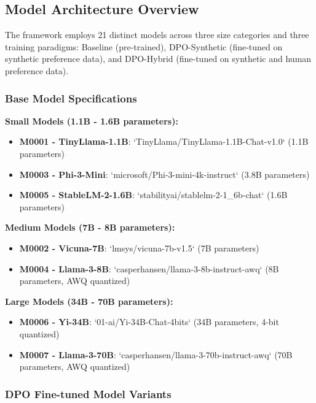 \subsection{Model Architecture Overview}
\label{subsec:model-architecture}

The framework employs 21 distinct models across three size categories and three training paradigms: Baseline (pre-trained), DPO-Synthetic (fine-tuned on synthetic preference data), and DPO-Hybrid (fine-tuned on synthetic and human preference data).

\subsubsection{Base Model Specifications}

\textbf{Small Models (1.1B - 1.6B parameters):}
\begin{itemize}
    \item \textbf{M0001 - TinyLlama-1.1B}: `TinyLlama/TinyLlama-1.1B-Chat-v1.0` (1.1B parameters)
    \item \textbf{M0003 - Phi-3-Mini}: `microsoft/Phi-3-mini-4k-instruct` (3.8B parameters)
    \item \textbf{M0005 - StableLM-2-1.6B}: `stabilityai/stablelm-2-1_6b-chat` (1.6B parameters)
\end{itemize}

\textbf{Medium Models (7B - 8B parameters):}
\begin{itemize}
    \item \textbf{M0002 - Vicuna-7B}: `lmsys/vicuna-7b-v1.5` (7B parameters)
    \item \textbf{M0004 - Llama-3-8B}: `casperhansen/llama-3-8b-instruct-awq` (8B parameters, AWQ quantized)
\end{itemize}

\textbf{Large Models (34B - 70B parameters):}
\begin{itemize}
    \item \textbf{M0006 - Yi-34B}: `01-ai/Yi-34B-Chat-4bits` (34B parameters, 4-bit quantized)
    \item \textbf{M0007 - Llama-3-70B}: `casperhansen/llama-3-70b-instruct-awq` (70B parameters, AWQ quantized)
\end{itemize}

\subsubsection{DPO Fine-tuned Model Variants}

